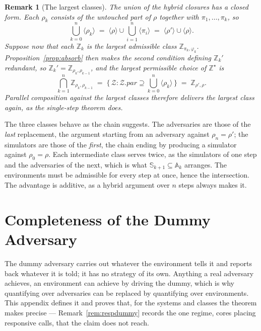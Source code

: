 \documentclass[11pt,a4paper]{article}
\newcommand{\pars}{\mathit{par}}
\newcommand{\Zenv}{\mathcal{Z}}
\newcommand{\Aset}{\mathbb{A}}
\newcommand{\SimSet}{\mathbb{S}}
\newcommand{\ZenvSet}{\mathbb{Z}}
\newcommand{\ncl}[1]{\langle #1 \rangle}
\theoremstyle{accentdef}
\newtheorem{remark}[definition]{Remark}
\theoremstyle{accentplain}
\begin{document}
\begin{remark}[The largest classes]\label{rem:parclasses}
The union of the hybrid closures has a closed form. Each $\rho_k$ consists of the
untouched part of $\rho$ together with $\pi_1,\ldots,\pi_k$, so
\[
  \bigcup_{k=0}^{n} \ncl{\rho_k} \;=\; \ncl{\rho} \cup \bigcup_{i=1}^{n} \ncl{\pi_i} \;=\; \ncl{\rho'} \cup \ncl{\rho} .
\]
Suppose now that each $\ZenvSet_k$ is the largest admissible class
$\ZenvSet_{\pi_k,\varphi_k}$. Proposition~\ref{prop:absorb} then makes the second condition
defining $\ZenvSet_k'$ redundant, so $\ZenvSet_k' = \ZenvSet_{\rho_k,\rho_{k-1}}$, and the
largest permissible choice of $\ZenvSet^{\star}$ is
\[
  \bigcap_{k=1}^{n} \ZenvSet_{\rho_k,\rho_{k-1}}
  \;=\; \bigl\{\, \Zenv : \Zenv.\pars \supseteq \textstyle\bigcup_{k=0}^{n} \ncl{\rho_k} \,\bigr\}
  \;=\; \ZenvSet_{\rho',\rho} .
\]
Parallel composition against the largest classes therefore delivers the largest class again, as
the single-step theorem does.
\end{remark}

The three classes behave as the chain suggests. The adversaries are those of the \emph{last}
replacement, the argument starting from an adversary against $\rho_n = \rho'$; the simulators are
those of the \emph{first}, the chain ending by producing a simulator against $\rho_0 = \rho$. Each
intermediate class serves twice, as the simulators of one step and the adversaries of the next,
which is what $\SimSet_{k+1} \subseteq \Aset_k$ arranges. The environments must be admissible for
every step at once, hence the intersection. The advantage is additive, as a hybrid argument over
$n$ steps always makes it.


\section{Completeness of the Dummy Adversary}\label{app:dummy}

The dummy adversary carries out whatever the environment tells it and reports back whatever it is
told; it has no strategy of its own. Anything a real adversary achieves, an environment can
achieve by driving the dummy, which is why quantifying over adversaries can be replaced by
quantifying over environments. This appendix defines it and proves that, for the systems and
classes the theorem makes precise --- Remark~\ref{rem:respdummy} records the one regime, cores
placing responsive calls, that the claim does not reach.
\end{document}
